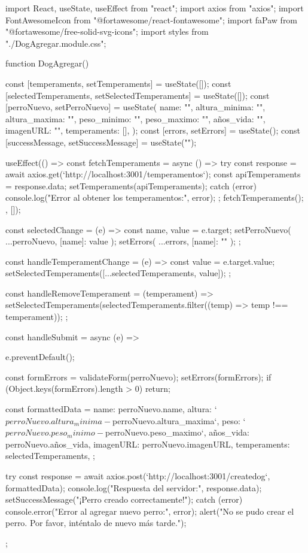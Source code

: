 import React, { useState, useEffect } from "react";
import axios from "axios";
import { FontAwesomeIcon } from "@fortawesome/react-fontawesome";
import { faPaw } from "@fortawesome/free-solid-svg-icons";
import styles from "./DogAgregar.module.css";

function DogAgregar() {
  const [temperaments, setTemperaments] = useState([]);
  const [selectedTemperaments, setSelectedTemperaments] = useState([]);
  const [perroNuevo, setPerroNuevo] = useState({
    name: "",
    altura_minima: "",
    altura_maxima: "",
    peso_minimo: "",
    peso_maximo: "",
    años_vida: "",
    imagenURL: "",
    temperaments: [],
  });
  const [errors, setErrors] = useState({});
  const [successMessage, setSuccessMessage] = useState("");

  useEffect(() => {
    const fetchTemperaments = async () => {
      try {
        const response = await axios.get(`http://localhost:3001/temperamentos`);
        const apiTemperaments = response.data;
        setTemperaments(apiTemperaments);
      } catch (error) {
        console.log("Error al obtener los temperamentos:", error);
      }
    };
    fetchTemperaments();
  }, []);

  const selectedChange = (e) => {
    const { name, value } = e.target;
    setPerroNuevo({ ...perroNuevo, [name]: value });
    setErrors({ ...errors, [name]: "" });
  };

  const handleTemperamentChange = (e) => {
    const value = e.target.value;
    setSelectedTemperaments([...selectedTemperaments, value]);
  };

  const handleRemoveTemperament = (temperament) => {
    setSelectedTemperaments(selectedTemperaments.filter((temp) => temp !== temperament));
  };

  const handleSubmit = async (e) => {
    e.preventDefault();

    const formErrors = validateForm(perroNuevo);
    setErrors(formErrors);
    if (Object.keys(formErrors).length > 0) {
      return;
    }

    const formattedData = {
      name: perroNuevo.name,
      altura: `${perroNuevo.altura_minima} - ${perroNuevo.altura_maxima}`,
      peso: `${perroNuevo.peso_minimo} - ${perroNuevo.peso_maximo}`,
      años_vida: perroNuevo.años_vida,
      imagenURL: perroNuevo.imagenURL,
      temperaments: selectedTemperaments,
    };

    try {
      const response = await axios.post(`http://localhost:3001/createdog`, formattedData);
      console.log("Respuesta del servidor:", response.data);
      setSuccessMessage("¡Perro creado correctamente!");
    } catch (error) {
      console.error("Error al agregar nuevo perro:", error);
      alert("No se pudo crear el perro. Por favor, inténtalo de nuevo más tarde.");
    }
  };

}
